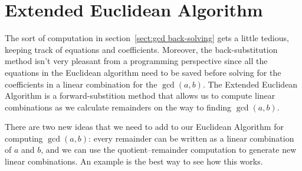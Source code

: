 \section{Extended Euclidean Algorithm}\label{sec:ext euc alg}
The sort of computation in section~\ref{sect:gcd back-solving}
gets a little tedious, keeping track of equations
and coefficients. Moreover, the back-substitution method isn't
very pleasant from a programming perspective since all the
equations in the Euclidean algorithm need to be saved before
solving for the coefficients in a linear combination for the $\gcd(a,b)$.
The Extended Euclidean Algorithm is a forward-substition method that
allows us to compute  linear combinations as we calculate remainders on the
way to finding $\gcd(a,b)$.

There are two new ideas that we need to add to our Euclidean Algorithm for computing
$\gcd(a,b)$: every remainder can be written as a linear combination of $a$ and $b$, and
we can use the quotient--remainder computation to generate new linear combinations.
An example is the best way to see how this works.

